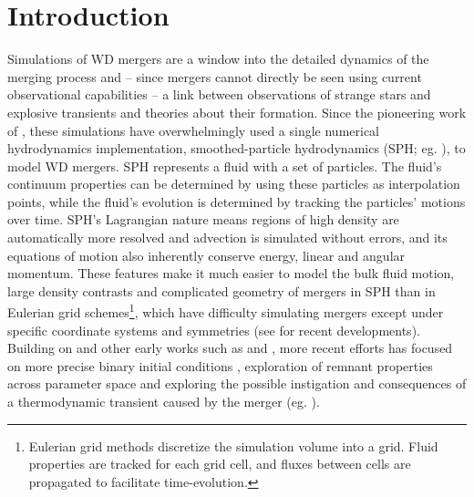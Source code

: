 \section{Introduction}
\label{sec:c3_intro}


Simulations of WD mergers are a window into the detailed dynamics of the merging process and -- since mergers cannot directly be seen using current observational capabilities -- a link between observations of strange stars and explosive transients and theories about their formation.  Since the pioneering work of \cite{benz+90}, these simulations have overwhelmingly used a single numerical hydrodynamics implementation, smoothed-particle hydrodynamics (SPH; eg. \citealt{mona05, spri10rev}), to model WD mergers.  SPH represents a fluid with a set of particles.  The fluid's continuum properties can be determined by using these particles as interpolation points, while the fluid's evolution is determined by tracking the particles' motions over time.  SPH's Lagrangian nature means regions of high density are automatically more resolved and advection is simulated without errors, and its equations of motion also inherently conserve energy, linear and angular momentum.  These features make it much easier to model the bulk fluid motion, large density contrasts and complicated geometry of mergers in SPH than in Eulerian grid schemes\footnote{Eulerian grid methods discretize the simulation volume into a grid.  Fluid properties are tracked for each grid cell, and fluxes between cells are propagated to facilitate time-evolution.}, which have difficulty simulating mergers except under specific coordinate systems and symmetries (see \cite{katz+16} for recent developments).  Building on \citeauthor{benz+90} and other early works such as \cite{segrcm97} and \cite{guerig04}, more recent efforts has focused on more precise binary initial conditions \citep{dan+11}, exploration of remnant properties across parameter space \citep{loreig09, rask+12, zhu+13, dan+14} and exploring the possible instigation and consequences of a thermodynamic transient caused by the merger (eg. \citealt{pakm+10, dan+12, pakm+13, moll+14, rask+14}).

